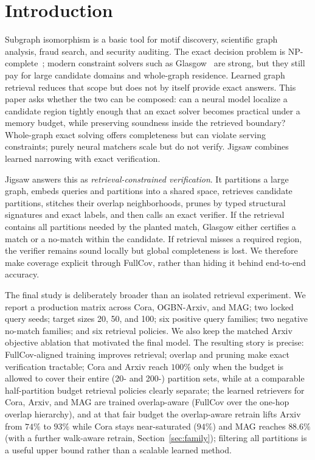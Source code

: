 \documentclass[runningheads]{llncs}
\begin{document}
\section{Introduction}

Subgraph isomorphism is a basic tool for motif discovery, scientific graph analysis, fraud search, and security auditing. The exact decision problem is NP-complete~\cite{ref_garey}; modern constraint solvers such as Glasgow~\cite{ref_glasgow} are strong, but they still pay for large candidate domains and whole-graph residence. Learned graph retrieval reduces that scope but does not by itself provide exact answers. This paper asks whether the two can be composed: can a neural model localize a candidate region tightly enough that an exact solver becomes practical under a memory budget, while preserving soundness inside the retrieved boundary? Whole-graph exact solving offers completeness but can violate serving constraints; purely neural matchers scale but do not verify. Jigsaw combines learned narrowing with exact verification.

Jigsaw answers this as \emph{retrieval-constrained verification}. It partitions a large graph, embeds queries and partitions into a shared space, retrieves candidate partitions, stitches their overlap neighborhoods, prunes by typed structural signatures and exact labels, and then calls an exact verifier. If the retrieval contains all partitions needed by the planted match, Glasgow either certifies a match or a no-match within the candidate. If retrieval misses a required region, the verifier remains sound locally but global completeness is lost. We therefore make coverage explicit through FullCov, rather than hiding it behind end-to-end accuracy.

The final study is deliberately broader than an isolated retrieval experiment. We report a production matrix across Cora, OGBN-Arxiv, and MAG; two locked query seeds; target sizes 20, 50, and 100; six positive query families; two negative no-match families; and six retrieval policies. We also keep the matched Arxiv objective ablation that motivated the final model. The resulting story is precise: FullCov-aligned training improves retrieval; overlap and pruning make exact verification tractable; Cora and Arxiv reach $100\%$ only when the budget is allowed to cover their entire (20- and 200-) partition sets, while at a comparable half-partition budget retrieval policies clearly separate; the learned retrievers for Cora, Arxiv, and MAG are trained overlap-aware (FullCov over the one-hop overlap hierarchy), and at that fair budget the overlap-aware retrain lifts Arxiv from $74\%$ to $93\%$ while Cora stays near-saturated ($94\%$) and MAG reaches $88.6\%$ (with a further walk-aware retrain, Section~\ref{sec:family}); filtering all partitions is a useful upper bound rather than a scalable learned method.
\end{document}
